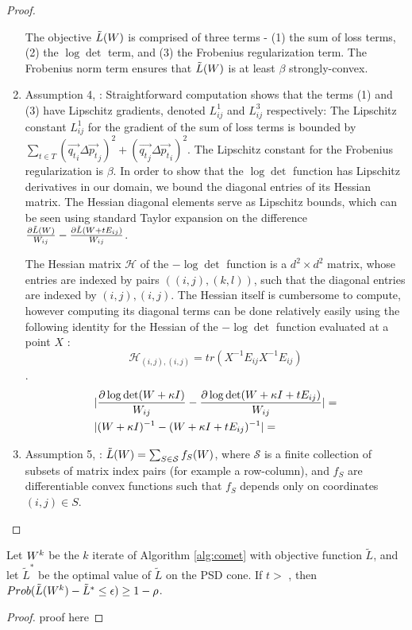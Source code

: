 \documentclass{article}
\begin{document}
\begin{proof}

\begin{enumerate}
The objective $\tilde{L}({W})$ is comprised of three terms - (1) the sum of loss terms, (2) the $\log \det$ term, and (3) the Frobenius regularization term. The Frobenius norm term ensures that $\tilde{L}({W})$ is at least $\beta$ strongly-convex.
\item Assumption 4, \citet{richtarik2013optimal}: Straightforward computation shows that the terms (1) and (3) have Lipschitz gradients, denoted $L^1_{ij}$ and $L^3_{ij}$ respectively: The Lipschitz constant $L^1_{ij}$ for the gradient of the sum of loss terms is bounded by $\sum_{t \in T} (\vec{{q_t}_i} {\Delta \vec{p_t}}_j)^2 + (\vec{{q_t}_j} {\Delta \vec{p_t}}_i)^2$. The Lipschitz constant for the Frobenius regularization is $\beta$.
In order to show that the $\log \det$ function has Lipschitz derivatives in our domain, we bound the diagonal entries of its Hessian matrix. The Hessian diagonal elements serve as Lipschitz bounds, which can be seen using standard Taylor expansion on the difference $\frac{\partial \tilde{L}({W})}{W_{ij}} - \frac{\partial \tilde{L}({W} + t {E}_{ij})}{W_{ij}}$.

The Hessian matrix $\mathcal{H}$ of the $- \log \det$ function is a $d^2 \times d^2$ matrix, whose entries are indexed by pairs $((i,j),(k,l))$, such that the diagonal entries are indexed by $(i,j),(i,j)$. The Hessian itself is cumbersome to compute, however computing its diagonal terms can be done relatively easily using the following identity for the Hessian of the $-\log \det$ function evaluated at a point $X$ :  $$\mathcal{H}_{(i,j),(i,j)} = tr\left(X^{-1}E_{ij} X^{-1}E_{ij}\right) $$ \citep{boyd2004convex}.
\begin{align}
&| \frac{\partial \log \det ({W} + \kappa I)}{{W}_{ij}}  - \frac{\partial \log \det ({W} + \kappa I + t {E}_{ij})}{{W}_{ij}}|  = \\
&| ({W} + \kappa I)^{-1} - ({W} + \kappa I + t{E}_{ij})^{-1} | = 
\end{align}
\item Assumption 5, \citet{richtarik2013optimal}: 
$\tilde{L}({W}) = \sum_{S \in \mathcal{S}} f_S ({W})$, where $\mathcal{S}$ is a finite collection of subsets of matrix index pairs (for example a row-column), and $f_S$ are differentiable convex functions such that $f_S$ depends only on coordinates $(i,j) \in S$.
\end{enumerate}\end{proof}

\begin{corollary}
Let ${W}^k$ be the $k$ iterate of Algorithm \ref{alg:comet} with objective function $\tilde{L}$, and let $\tilde{L}^*$ be the optimal value of $\tilde{L}$ on the PSD cone.
If $t >$ , then $Prob(\tilde{L}({W}^k) - \tilde{L}^* \leq \epsilon) \geq 1-\rho$.
\end{corollary}
\begin{proof}
proof here
\end{proof}
\end{document}
